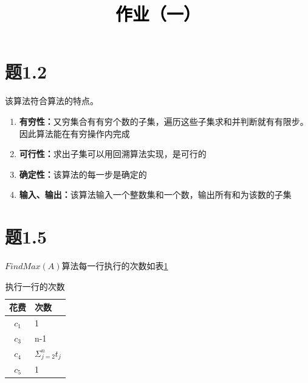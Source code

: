 \documentclass[a4paper,twoside]{article}
\newcommand{\PaperTitle}{作业（一）}  %
\begin{document}
\newpage

\title{
	\Large{\textcolor{black}{\PaperTitle}}
}
	
	
\maketitle
	
\tableofcontents
 
\newpage
\begin{spacing}{1.2}

\section{题1.2}

该算法符合算法的特点。

\begin{enumerate}
	\item \textbf{有穷性：}又穷集合有有穷个数的子集，遍历这些子集求和并判断就有有限步。因此算法能在有穷操作内完成
	
	\item \textbf{可行性：}求出子集可以用回溯算法实现，是可行的
	
	\item \textbf{确定性：}该算法的每一步是确定的
	
	\item \textbf{输入、输出：}该算法输入一个整数集和一个数，输出所有和为该数的子集
\end{enumerate}

\section{题1.5}

$FindMax(A)$算法每一行执行的次数如表\ref{tbl:p15}

\begin{table}[h]
	\renewcommand{\arraystretch}{1.2}
	\caption{执行一行的次数}
	\label{tbl:p15}
	\begin{center}
		{\footnotesize
			\begin{tabular}{c l}
				\toprule
				{花费} & {次数} \\
				\midrule
				$c_1$ & 1 \\
				\hline
				$c_3$ & n-1 \\
				\hline
				$c_4$ & $\Sigma_{j=2}^{n}t_j$ \\
				\hline
				$c_5$ & 1 \\
				\bottomrule
		\end{tabular}}
	\end{center}
\end{table}


\end{spacing}
\end{document}
